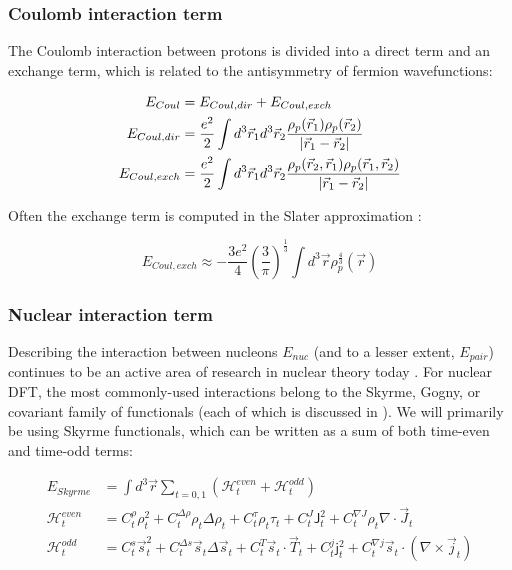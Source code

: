 \subsubsection{Coulomb interaction term}
The Coulomb interaction between protons is divided into a direct term and an exchange term, which is related to the antisymmetry of fermion wavefunctions:

\begin{align}
E_{Coul} &= E_{Coul, dir} + E_{Coul, exch} \\
E_{Coul, dir}& = \frac{e^2}{2} \int d^3\vec{r}_1 d^3\vec{r}_2 \frac{\rho_p(\vec{r}_1)\rho_p(\vec{r}_2)}{\abs{\vec{r}_1-\vec{r}_2}} \\
E_{Coul, exch} &= \frac{e^2}{2} \int d^3\vec{r}_1 d^3\vec{r}_2 \frac{\rho_p(\vec{r}_2,\vec{r}_1)\rho_p(\vec{r}_1,\vec{r}_2)}{\abs{\vec{r}_1-\vec{r}_2}}
\end{align}

Often the exchange term is computed in the Slater approximation \cite{Slater1951, TitinSchnaider1974}:

\begin{equation}
E_{Coul, exch} \approx -\frac{3e^2}{4} \left(\frac{3}{\pi}\right)^\frac{1}{3} \int d^3\vec{r} \rho_p^\frac{4}{3}(\vec{r})
\end{equation}

\subsubsection{Nuclear interaction term}
Describing the interaction between nucleons $E_{nuc}$ (and to a lesser extent, $E_{pair}$) continues to be an active area of research in nuclear theory today \cite{Machleidt2011,Machleidt2016,Epelbaum2009,Detmold2015,Stroberg2019}. For nuclear DFT, the most commonly-used interactions belong to the Skyrme, Gogny, or covariant family of functionals (each of which is discussed in \cite{Bender2003}). We will primarily be using Skyrme functionals, which can be written as a sum of both time-even and time-odd terms:

\begin{align}
E_{Skyrme} &= \int d^3\vec{r} \sum_{t=0,1} \left( \mathcal{H}^{even}_t + \mathcal{H}^{odd}_t \right)\\
\mathcal{H}^{even}_t &= C^\rho_t\rho_t^2 + C_t^{\Delta\rho}\rho_t\Delta\rho_t + C^\tau_t\rho_t\tau_t + C^J_t\mathsf{J}^2_t + C^{\nabla J}_t\rho_t\nabla\cdot\vec{J}_t \\
\mathcal{H}^{odd}_t &= C^s_t \vec{s}_t^2 + C_t^{\Delta s}\vec{s}_t\Delta\vec{s}_t + C^T_t\vec{s}_t\cdot\vec{T}_t + C^j_t\mathsf{j}^2_t + C^{\nabla j}_t\vec{s}_t\cdot(\nabla\times\vec{j}_t)
\end{align}

